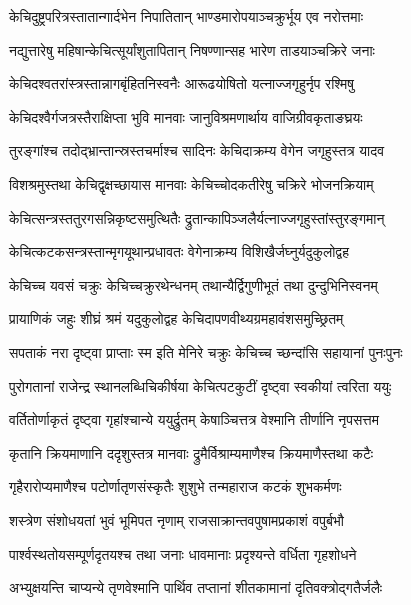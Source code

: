 \twolineshloka
{केचिदुष्ट्रपरित्रस्तातान्गार्दभेन निपातितान्}
{भाण्डमारोपयाञ्चक्रुर्भूय एव नरोत्तमाः}%

\twolineshloka
{नद्युत्तारेषु महिषान्केचित्सूर्यांशुतापितान्}
{निषण्णान्सह भारेण ताडयाञ्चक्रिरे जनाः}%

\twolineshloka
{केचिदश्वतरांस्त्रस्तान्नागबृंहितनिस्वनैः}
{आरूढयोषितो यत्नाज्जगृहुर्नृप रश्मिषु}%

\twolineshloka
{केचिदश्वैर्गजत्रस्तैराक्षिप्ता भुवि मानवाः}
{जानुविश्रमणार्थाय वाजिग्रीवकृताङघ्रयः}%

\twolineshloka
{तुरङ्गांश्च तदोद्भ्रान्तान्स्रस्तचर्माश्च सादिनः}
{केचिदाक्रम्य वेगेन जगृहुस्तत्र यादव}%

\twolineshloka
{विशश्रमुस्तथा केचिद्वृक्षच्छायास मानवाः}
{केचिच्चोदकतीरेषु चक्रिरे भोजनक्रियाम्} %

\twolineshloka
{केचित्सन्त्रस्ततुरगसन्निकृष्टसमुत्थितैः}
{द्रुतान्कापिञ्जलैर्यत्नाज्जगृहुस्तांस्तुरङ्गमान्}%
 
\twolineshloka
{केचित्कटकसन्त्रस्तान्मृगयूथान्प्रधावतः}
{वेगेनाक्रम्य विशिखैर्जघ्नुर्यदुकुलोद्वह}%

\twolineshloka
{केचिच्च यवसं चक्रुः केचिच्चक्रुरथेन्धनम्}
{तथान्यैर्द्विगुणीभूतं तथा दुन्दुभिनिस्वनम्}%

\twolineshloka
{प्रायाणिकं जहुः शीघ्रं श्रमं यदुकुलोद्वह}
{केचिदापणवीथ्यग्रमहावंशसमुच्छ्रितम्}%

\twolineshloka
{सपताकं नरा दृष्ट्वा प्राप्ताः स्म इति मेनिरे}
{चक्रुः केचिच्च च्छन्दांसि सहायानां पुनःपुनः}%

\twolineshloka
{पुरोगतानां राजेन्द्र स्थानलब्धिचिकीर्षया}
{केचित्पटकुटीं दृष्ट्वा स्वकीयां त्वरिता ययुः}%

\twolineshloka
{वर्तितोर्णाकृतं दृष्ट्वा गृहांश्चान्ये ययुर्द्रुतम्}
{केषाञ्चित्तत्र वेश्मानि तीर्णानि नृपसत्तम}%

\twolineshloka
{कृतानि क्रियमाणानि ददृशुस्तत्र मानवाः}
{द्रुमैर्विश्राम्यमाणैश्च क्रियमाणैस्तथा कटैः}%

\twolineshloka
{गृहैरारोप्यमाणैश्च पटोर्णातृणसंस्कृतैः}
{शुशुभे तन्महाराज कटकं शुभकर्मणः}%

\twolineshloka
{शस्त्रेण संशोधयतां भुवं भूमिपत नृणाम्}
{राजसाक्रान्तवपुषामप्रकाशं वपुर्बभौ} %

\twolineshloka
{पार्श्वस्थतोयसम्पूर्णदृतयश्च तथा जनाः}
{धावमानाः प्रदृश्यन्ते वर्धिता गृहशोधने}%

\twolineshloka
{अभ्युक्षयन्ति चाप्यन्ये तृणवेश्मानि पार्थिव}
{तप्तानां शीतकामानां दृतिवक्त्रोद्गतैर्जलैः}%

